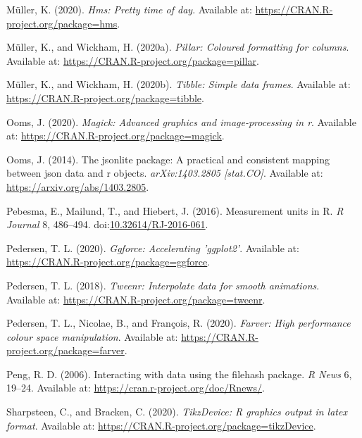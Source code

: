 \documentclass[utf8]{frontiersSCNS}
\begin{document}
\leavevmode\hypertarget{ref-mller2020pretty}{}%
Müller, K. (2020). \emph{Hms: Pretty time of day}. Available at:
\url{https://CRAN.R-project.org/package=hms}.

\leavevmode\hypertarget{ref-mller2020pillar}{}%
Müller, K., and Wickham, H. (2020a). \emph{Pillar: Coloured formatting
for columns}. Available at:
\url{https://CRAN.R-project.org/package=pillar}.

\leavevmode\hypertarget{ref-mller2020tibble}{}%
Müller, K., and Wickham, H. (2020b). \emph{Tibble: Simple data frames}.
Available at: \url{https://CRAN.R-project.org/package=tibble}.

\leavevmode\hypertarget{ref-ooms2020magick}{}%
Ooms, J. (2020). \emph{Magick: Advanced graphics and image-processing in
r}. Available at: \url{https://CRAN.R-project.org/package=magick}.

\leavevmode\hypertarget{ref-ooms2014jsonlite}{}%
Ooms, J. (2014). The jsonlite package: A practical and consistent
mapping between json data and r objects. \emph{arXiv:1403.2805
{[}stat.CO{]}}. Available at: \url{https://arxiv.org/abs/1403.2805}.

\leavevmode\hypertarget{ref-pebesma2016measurement}{}%
Pebesma, E., Mailund, T., and Hiebert, J. (2016). Measurement units in
R. \emph{R Journal} 8, 486--494.
doi:\href{https://doi.org/10.32614/RJ-2016-061}{10.32614/RJ-2016-061}.

\leavevmode\hypertarget{ref-pedersen2020ggforce}{}%
Pedersen, T. L. (2020). \emph{Ggforce: Accelerating 'ggplot2'}.
Available at: \url{https://CRAN.R-project.org/package=ggforce}.

\leavevmode\hypertarget{ref-pedersen2018tweenr}{}%
Pedersen, T. L. (2018). \emph{Tweenr: Interpolate data for smooth
animations}. Available at:
\url{https://CRAN.R-project.org/package=tweenr}.

\leavevmode\hypertarget{ref-pedersen2020farver}{}%
Pedersen, T. L., Nicolae, B., and François, R. (2020). \emph{Farver:
High performance colour space manipulation}. Available at:
\url{https://CRAN.R-project.org/package=farver}.

\leavevmode\hypertarget{ref-peng2006interacting}{}%
Peng, R. D. (2006). Interacting with data using the filehash package.
\emph{R News} 6, 19--24. Available at:
\url{https://cran.r-project.org/doc/Rnews/}.

\leavevmode\hypertarget{ref-sharpsteen2020tikzdevice}{}%
Sharpsteen, C., and Bracken, C. (2020). \emph{TikzDevice: R graphics
output in latex format}. Available at:
\url{https://CRAN.R-project.org/package=tikzDevice}.
\end{document}
